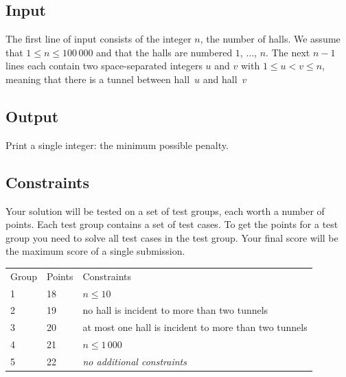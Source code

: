 \subsection*{Input}

The first line of input consists of the integer $n$, the number of halls.
We assume that $1\leq n\leq 100\,000$ and that the halls are numbered $1$, $\ldots$, $n$.
The next $n-1$ lines each contain two space-separated integers $u$ and $v$ with $1\leq u < v \leq n$, meaning that there is a tunnel between hall~$u$ and hall~$v$ 

\subsection*{Output}

Print a single integer: the minimum possible penalty.

\subsection*{Constraints}

Your solution will be tested on a set of test groups, each worth a number of points.
Each test group contains a set of test cases.
To get the points for a test group you need to solve all test cases in the test group.
Your final score will be the maximum score of a single submission.

\begin{tabular}{lll}
Group & Points & Constraints \\
1 & 18 & $n\leq 10$\\
2 & 19 & no hall is incident to more than two tunnels\\
3 & 20 & at most one hall is incident to more than two tunnels\\
4 & 21 & $n\leq 1\,000$\\
5 & 22 & \emph{no additional constraints}
\end{tabular}
